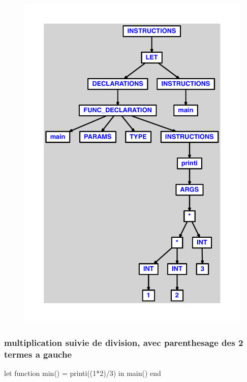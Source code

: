 \documentclass{article}
\begin{document}
\begin{figure}[H]\centering\includegraphics[max width=\textwidth]{ast/ast_101.pdf}\end{figure}\subsubsection{multiplication suivie de division, avec parenthesage des 2 termes a gauche}
\begin{verbatimtab}
let function min() = printi((1*2)/3) in main() end
\end{verbatimtab}
\end{document}
